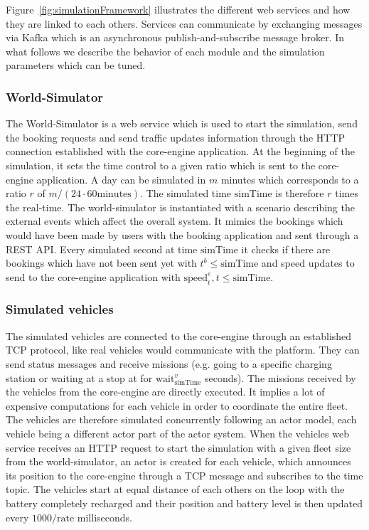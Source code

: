 \documentclass[12pt,a4paper]{article}
\begin{document}
Figure~\ref{fig:simulationFramework} illustrates the different web services and how they are linked to each others. Services can communicate by exchanging messages via Kafka which is an asynchronous publish-and-subscribe message broker. In what follows we describe the behavior of each module and the simulation parameters which can be tuned. 

\subsubsection{World-Simulator}
The World-Simulator is a web service which is used to start the simulation, send the booking requests and send traffic updates information through the HTTP connection established with the core-engine application. At the beginning of the simulation, it sets the time control to a given ratio which is sent to the core-engine application. A day can be simulated in $m$ minutes which corresponds to a ratio $r$ of $m / (24 \cdot 60 \text{minutes})$. The simulated time $\text{simTime}$ is therefore $r$ times the real-time. The world-simulator is instantiated with a scenario describing the external events which affect the overall system. It mimics the bookings which would have been made by users with the booking application and sent through a REST API. Every simulated second at time $\text{simTime}$ it checks if there are bookings which have not been sent yet with $t^{b} \leq \text{simTime}$ and speed updates to send to the core-engine application with $\text{speed}_{t}^{e}, t \leq \text{simTime}$. 

\subsubsection{Simulated vehicles}\label{simvehicles}
The simulated vehicles are connected to the core-engine through an established TCP protocol, like real vehicles would communicate with the platform. They can send status messages and receive missions (e.g. going to a specific charging station or waiting at a stop at for $\text{wait}^{v}_{\text{simTime}}$ seconds). The missions received by the vehicles from the core-engine are directly executed. It implies a lot of expensive computations for each vehicle in order to coordinate the entire fleet. The vehicles are therefore simulated concurrently following an actor model, each vehicle being a different actor part of the actor system. When the vehicles web service receives an HTTP request to start the simulation with a given fleet size from the world-simulator, an actor is created for each vehicle, which announces its position to the core-engine through a TCP message and subscribes to the time topic. The vehicles start at equal distance of each others on the loop with the battery completely recharged and their position and battery level is then updated every $1000/\text{rate}$ milliseconds.  
\end{document}
